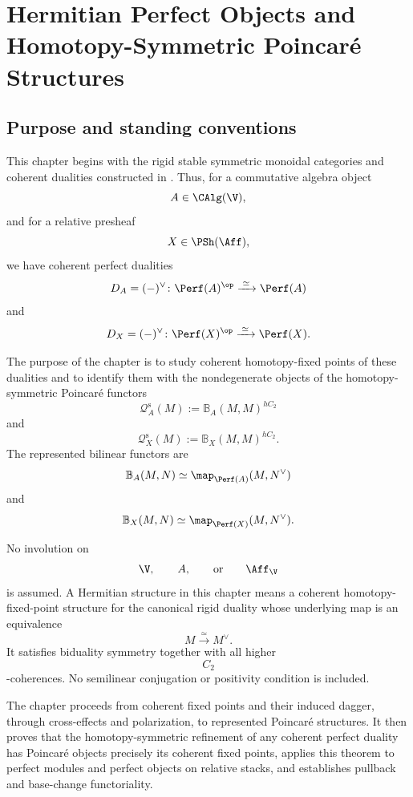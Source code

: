 \chapter{Hermitian Perfect Objects and Homotopy-Symmetric Poincar\'e Structures}
\label{chap:hermitian-poincare}

\section{Purpose and standing conventions}
\label{sec:hermitian-poincare-purpose}

This chapter begins with the rigid stable symmetric monoidal categories and
coherent dualities constructed in
. Thus, for a commutative algebra object
\[
    A\in\CAlg(\V),
\]
and for a relative presheaf
\[
    X\in\PSh(\Aff),
\]
we have coherent perfect dualities
\[
    D_A=(-)^\vee
    \colon
    \Perf(A)^{\op}
    \xrightarrow{\;\simeq\;}
    \Perf(A)
\]
and
\[
    D_X=(-)^\vee
    \colon
    \Perf(X)^{\op}
    \xrightarrow{\;\simeq\;}
    \Perf(X).
\]

The purpose of the chapter is to study coherent homotopy-fixed points of
these dualities and to identify them with the nondegenerate objects of the
homotopy-symmetric Poincar\'e functors
\[
    \mathcal Q_A^{\mathrm s}(M)
    :=
    \mathbb B_A(M,M)^{hC_2}
\]
and
\[
    \mathcal Q_X^{\mathrm s}(M)
    :=
    \mathbb B_X(M,M)^{hC_2}.
\]
The represented bilinear functors are
\[
    \mathbb B_A(M,N)
    \simeq
    \map_{\Perf(A)}(M,N^\vee)
\]
and
\[
    \mathbb B_X(M,N)
    \simeq
    \map_{\Perf(X)}(M,N^\vee).
\]

No involution on
\[
    \V,
    \qquad
    A,
    \qquad\text{or}\qquad
    \Aff_{\V}
\]
is assumed. A Hermitian structure in this chapter means a coherent
homotopy-fixed-point structure for the canonical rigid duality whose
underlying map is an equivalence
\[
    M
    \xrightarrow{\;\simeq\;}
    M^\vee.
\]
It satisfies biduality symmetry together with all higher
\[
    C_2
\]
-coherences. No semilinear conjugation or positivity condition is included.

The chapter proceeds from coherent fixed points and their induced dagger,
through cross-effects and polarization, to represented Poincar\'e
structures. It then proves that the homotopy-symmetric refinement of any
coherent perfect duality has Poincar\'e objects precisely its coherent fixed
points, applies this theorem to perfect modules and perfect objects on
relative stacks, and establishes pullback and base-change functoriality.

